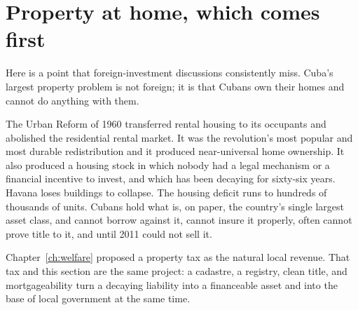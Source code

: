 \section{Property at home, which comes first}

Here is a point that foreign-investment discussions consistently miss. Cuba's
largest property problem is not foreign; it is that Cubans own their homes and
cannot do anything with them.

The Urban Reform of 1960 transferred rental housing to its occupants and abolished
the residential rental market. It was the revolution's most popular and most
durable redistribution and it produced near-universal home ownership. It also
produced a housing stock in which nobody had a legal mechanism or a financial
incentive to invest, and which has been decaying for sixty-six years. Havana loses
buildings to collapse. The housing deficit runs to hundreds of thousands of
units.\unv{} Cubans hold what is, on paper, the country's single largest asset
class, and cannot borrow against it, cannot insure it properly, often cannot
prove title to it, and until 2011 could not sell it.

Chapter~\ref{ch:welfare} proposed a property tax as the natural local revenue.
That tax and this section are the same project: a cadastre, a registry, clean
title, and mortgageability turn a decaying liability into a financeable asset and
into the base of local government at the same time.

